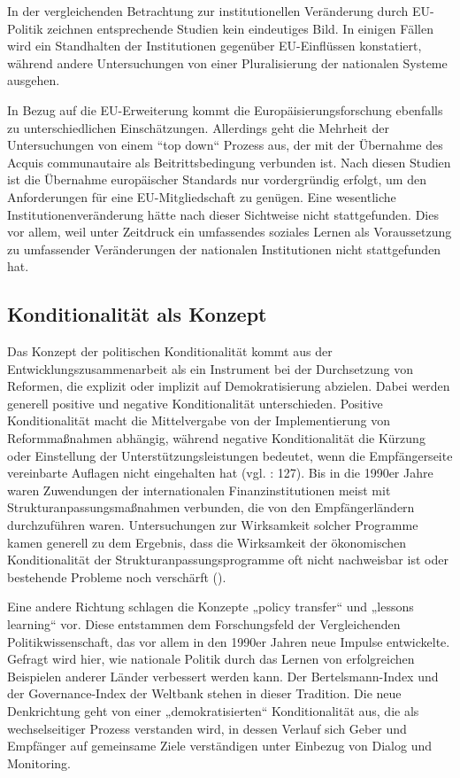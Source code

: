 \par
In der vergleichenden Betrachtung zur institutionellen Veränderung durch EU-Politik zeichnen entsprechende Studien kein eindeutiges Bild. In einigen Fällen wird ein Standhalten der Institutionen gegenüber EU-Einflüssen konstatiert, während andere Untersuchungen von einer Pluralisierung der nationalen Systeme ausgehen.\par
In Bezug auf die EU-Erweiterung kommt die Europäisierungsforschung ebenfalls zu unterschiedlichen Einschätzungen. Allerdings geht die Mehrheit der Untersuchungen von einem “top down“ Prozess aus, der mit der Übernahme des Acquis communautaire als Beitrittsbedingung verbunden ist. Nach diesen Studien ist die Übernahme europäischer Standards nur vordergründig erfolgt, um den Anforderungen für eine EU-Mitgliedschaft zu genügen. Eine wesentliche Institutionenveränderung hätte nach dieser Sichtweise nicht stattgefunden. Dies vor allem, weil unter Zeitdruck ein umfassendes soziales Lernen als Voraussetzung zu umfassender Veränderungen der nationalen Institutionen nicht stattgefunden hat.
\subsection{Konditionalität als Konzept}
Das Konzept der politischen Konditionalität kommt aus der Entwicklungszusammenarbeit als ein Instrument bei der Durchsetzung von Reformen, die explizit oder implizit auf Demokratisierung abzielen. Dabei werden generell positive und negative Konditionalität unterschieden. Positive Konditionalität macht die Mittelvergabe von der Implementierung von Reformmaßnahmen abhängig, während negative Konditionalität die Kürzung oder Einstellung der Unterstützungsleistungen bedeutet, wenn die Empfängerseite vereinbarte Auflagen nicht eingehalten hat (vgl. \cite{schmitz09}: 127). Bis in die 1990er Jahre waren Zuwendungen der internationalen Finanzinstitutionen meist mit Strukturanpassungsmaßnahmen verbunden, die von den Empfängerländern durchzuführen waren. Untersuchungen zur Wirksamkeit solcher Programme kamen generell zu dem Ergebnis, dass die Wirksamkeit der ökonomischen Konditionalität der Strukturanpassungsprogramme oft nicht nachweisbar ist oder bestehende Probleme noch verschärft (\cite{killick, morrissey}). 
\par
Eine andere Richtung schlagen die Konzepte „policy transfer“ und „lessons learning“ vor. Diese entstammen dem Forschungsfeld der Vergleichenden Politikwissenschaft, das vor allem in den 1990er Jahren neue Impulse entwickelte. Gefragt wird hier, wie nationale Politik durch das Lernen von erfolgreichen Beispielen anderer Länder verbessert werden kann. Der Bertelsmann-Index und der Governance-Index der Weltbank stehen in dieser Tradition. Die neue Denkrichtung geht von einer „demokratisierten“ Konditionalität aus, die als wechselseitiger Prozess verstanden wird, in dessen Verlauf sich Geber und Empfänger auf gemeinsame Ziele verständigen unter Einbezug von Dialog und Monitoring.
